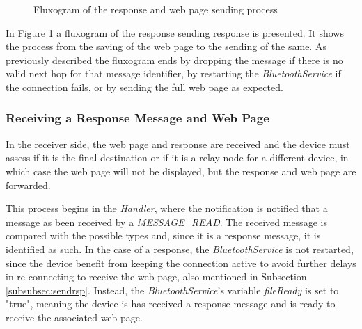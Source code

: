 \begin{figure}[ht]
   \noindent{}
	\caption{\label{fig:rspsendflux} Fluxogram of the response and web page sending process}
\end{figure}

In Figure \ref{fig:rspsendflux} a fluxogram of the response sending response is presented. It shows the process from the saving of the web page to the sending of the same. As previously described the fluxogram ends by dropping the message if there is no valid next hop for that message identifier, by restarting the \textit{BluetoothService} if the connection fails, or by sending the full web page as expected.

\subsubsection{Receiving a Response Message and Web Page}
\label{subsubsec:rcvrsp}

In the receiver side, the web page and response are received and the device must assess if it is the final destination or if it is a relay node for a different device, in which case the web page will not be displayed, but the response and web page are forwarded.

This process begins in the \textit{Handler}, where the notification is notified that a message as been received by a \textit{MESSAGE\_READ}. The received message is compared with the possible types and, since it is a response message, it is identified as such. In the case of a response, the \textit{BluetoothService} is not restarted, since the device benefit from keeping the connection active to avoid further delays in re-connecting to receive the web page, also mentioned in Subsection \ref{subsubsec:sendrsp}. Instead, the \textit{BluetoothService}'s variable \textit{fileReady} is set to "true", meaning the device is has received a response message and is ready to receive the associated web page.

